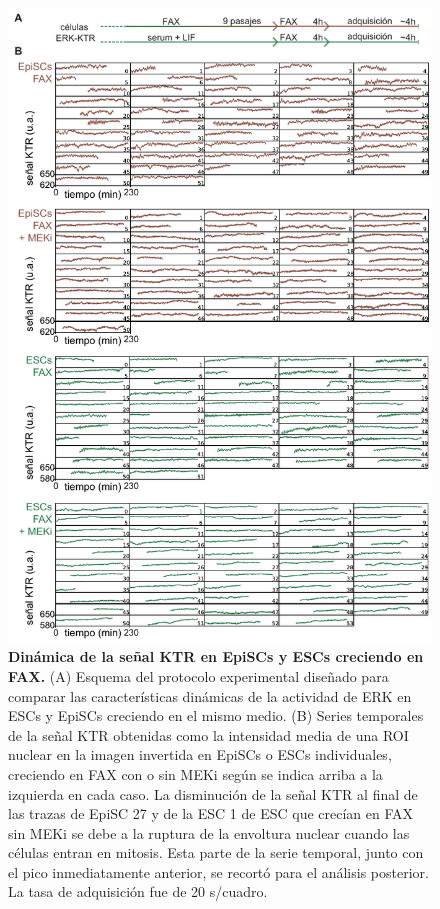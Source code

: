 \documentclass[./main.tex]{subfiles}
\begin{document}
\begin{figure}
    \centering
    \includegraphics[width=1\columnwidth]{figures/chapter3/C3_EpiSC_traces.pdf} \caption{\textbf{Dinámica de la señal KTR en EpiSCs y ESCs creciendo en FAX.} (A) Esquema del protocolo experimental diseñado para comparar las características dinámicas de la actividad de ERK en ESCs y EpiSCs creciendo en el mismo medio. (B) Series temporales de la señal KTR obtenidas como la intensidad media de una ROI nuclear en la imagen invertida en EpiSCs o ESCs individuales, creciendo en FAX con o sin MEKi según se indica arriba a la izquierda en cada caso. La disminución de la señal KTR al final de las trazas de EpiSC 27 y de la ESC 1 de ESC que crecían en FAX sin MEKi se debe a la ruptura de la envoltura nuclear cuando las células entran en mitosis. Esta parte de la serie temporal, junto con el pico inmediatamente anterior, se recortó para el análisis posterior. La tasa de adquisición fue de 20 s/cuadro.}
    \label{C3_fig:EPI_traces}
\end{figure}
\end{document}
